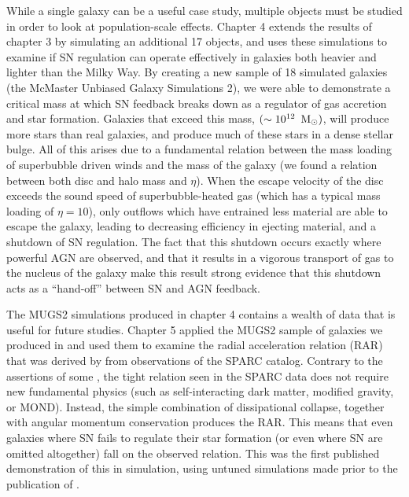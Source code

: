 While a single galaxy can be a useful case study, multiple objects must be
studied in order to look at population-scale effects.  Chapter 4 extends the
results of chapter 3 by simulating an additional 17 objects, and uses these
simulations to examine if SN regulation can operate effectively in galaxies both
heavier and lighter than the Milky Way.  By creating a new sample of 18
simulated galaxies (the McMaster Unbiased Galaxy Simulations 2), we were able to
demonstrate a critical mass at which SN feedback breaks down as a regulator of
gas accretion and star formation.  Galaxies that exceed this mass, $(\sim
10^{12}\;\>{\rm M_{\odot}})$, will produce more stars than real galaxies, and produce much
of these stars in a dense stellar bulge.  All of this arises due to a
fundamental relation between the mass loading of superbubble driven winds and
the mass of the galaxy (we found a relation between both disc and halo mass and
$\eta$).  When the escape velocity of the disc exceeds the sound speed of
superbubble-heated gas (which has a typical mass loading of $\eta=10$), only
outflows which have entrained less material are able to escape the galaxy,
leading to decreasing efficiency in ejecting material, and a shutdown of SN
regulation.  The fact that this shutdown occurs exactly where powerful AGN are
observed, and that it results in a vigorous transport of gas to the nucleus of
the galaxy make this result strong evidence that this shutdown acts as a 
``hand-off'' between SN and AGN feedback.

The MUGS2 simulations produced in chapter 4 contains a wealth of data
that is useful for future studies. Chapter 5 applied the MUGS2 sample of
galaxies we produced in \citet{Keller2016a} and used them to examine the radial
acceleration relation (RAR) that was derived by \citet{McGaugh2016} from
observations of the SPARC \citep{Lelli2016} catalog.  Contrary to the assertions
of some \citep{Milgrom2016}, the tight relation seen in the SPARC data does not
require new fundamental physics (such as self-interacting dark matter, modified
gravity, or MOND).  Instead, the simple combination of dissipational collapse,
together with angular momentum conservation produces the RAR. This means that
even galaxies where SN fails to regulate their star formation (or even where SN
are omitted altogether) fall on the observed relation.  This was the first
published demonstration of this in simulation, using untuned simulations made
prior to the publication of \citet{McGaugh2016}.

